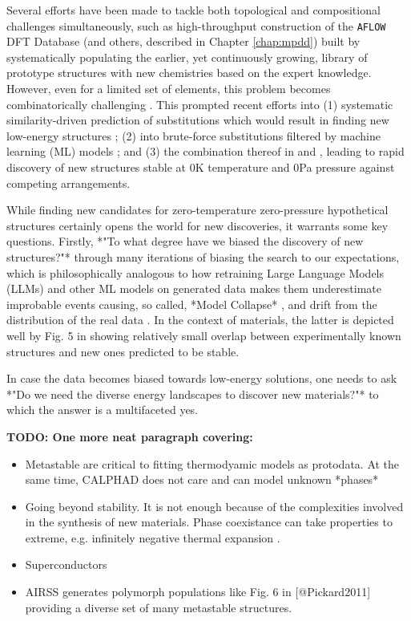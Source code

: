 Several efforts have been made to tackle both topological and compositional challenges simultaneously, such as high-throughput construction of the \texttt{AFLOW} \cite{Curtarolo2012} DFT Database \cite{Toher2018} (and others, described in Chapter \ref{chap:mpdd}) built by systematically populating the earlier, yet continuously growing, library of prototype structures \cite{Mehl2016} with new chemistries based on the expert knowledge. However, even for a limited set of elements, this problem becomes combinatorically challenging \cite{Krajewski2024Nimplex}. This prompted recent efforts into (1) systematic similarity-driven prediction of substitutions which would result in finding new low-energy structures \cite{Wang2021}; (2) into brute-force substitutions filtered by machine learning (ML) models \cite{Schmidt2023}; and (3) the combination thereof in \citet{Ye2022} and \citet{Merchant2023}, leading to rapid discovery of new structures stable at 0K temperature and 0Pa pressure against competing arrangements.

While finding new candidates for zero-temperature zero-pressure hypothetical structures certainly opens the world for new discoveries, it warrants some key questions. Firstly, *"To what degree have we biased the discovery of new structures?"* through many iterations of biasing the search to our expectations, which is philosophically analogous to how retraining Large Language Models (LLMs) and other ML models on generated data makes them underestimate improbable events causing, so called, *Model Collapse* \cite{Shumailov2023}, and drift from the distribution of the real data \cite{Alemohammad2023}. In the context of materials, the latter is depicted well by Fig. 5 in \citet{Ye2022} showing relatively small overlap between experimentally known structures and new ones predicted to be stable.

In case the data becomes biased towards low-energy solutions, one needs to ask *"Do we need the diverse energy landscapes to discover new materials?"* to which the answer is a multifaceted yes.

\vspace{24pt}
\textbf{TODO: One more neat paragraph covering:}
\begin{itemize}
    \item Metastable are critical to fitting thermodyamic models as protodata. At the same time, CALPHAD does not care and can model unknown *phases* \citet{Olson2023}
    \item Going beyond stability. It is not enough \cite{Zunger2019} because of the complexities involved in the synthesis of new materials. Phase coexistance can take properties to extreme, e.g. infinitely negative thermal expansion \cite{Liu2022}. 
    \item Superconductors \cite{Ferreira2023}
    \item AIRSS generates polymorph populations like Fig. 6 in [@Pickard2011] providing a diverse set of many metastable structures.
\end{itemize}


